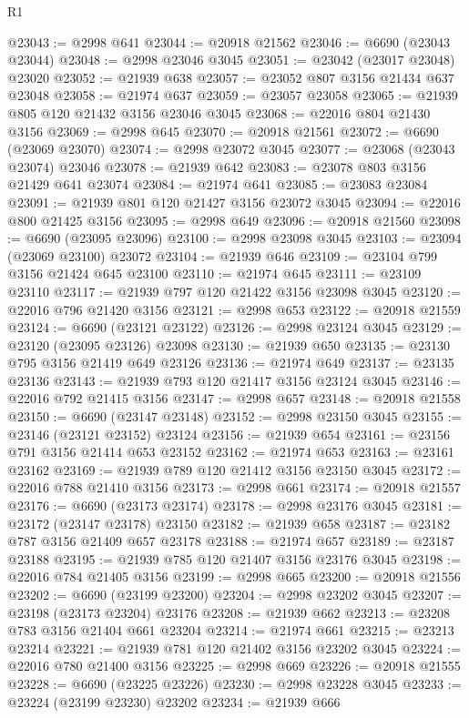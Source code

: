 \begin{lexlean}{R1}
\begin{coremodule}
@23043 := @2998 @641
@23044 := @20918 @21562
@23046 := @6690 (@23043 @23044)
@23048 := @2998 @23046 @3045
@23051 := @23042 (@23017 @23048) @23020
@23052 := @21939 @638
@23057 := @23052 @807 @3156 @21434 @637 @23048
@23058 := @21974 @637
@23059 := @23057 @23058
@23065 := @21939 @805 @120 @21432 @3156 @23046 @3045
@23068 := @22016 @804 @21430 @3156
@23069 := @2998 @645
@23070 := @20918 @21561
@23072 := @6690 (@23069 @23070)
@23074 := @2998 @23072 @3045
@23077 := @23068 (@23043 @23074) @23046
@23078 := @21939 @642
@23083 := @23078 @803 @3156 @21429 @641 @23074
@23084 := @21974 @641
@23085 := @23083 @23084
@23091 := @21939 @801 @120 @21427 @3156 @23072 @3045
@23094 := @22016 @800 @21425 @3156
@23095 := @2998 @649
@23096 := @20918 @21560
@23098 := @6690 (@23095 @23096)
@23100 := @2998 @23098 @3045
@23103 := @23094 (@23069 @23100) @23072
@23104 := @21939 @646
@23109 := @23104 @799 @3156 @21424 @645 @23100
@23110 := @21974 @645
@23111 := @23109 @23110
@23117 := @21939 @797 @120 @21422 @3156 @23098 @3045
@23120 := @22016 @796 @21420 @3156
@23121 := @2998 @653
@23122 := @20918 @21559
@23124 := @6690 (@23121 @23122)
@23126 := @2998 @23124 @3045
@23129 := @23120 (@23095 @23126) @23098
@23130 := @21939 @650
@23135 := @23130 @795 @3156 @21419 @649 @23126
@23136 := @21974 @649
@23137 := @23135 @23136
@23143 := @21939 @793 @120 @21417 @3156 @23124 @3045
@23146 := @22016 @792 @21415 @3156
@23147 := @2998 @657
@23148 := @20918 @21558
@23150 := @6690 (@23147 @23148)
@23152 := @2998 @23150 @3045
@23155 := @23146 (@23121 @23152) @23124
@23156 := @21939 @654
@23161 := @23156 @791 @3156 @21414 @653 @23152
@23162 := @21974 @653
@23163 := @23161 @23162
@23169 := @21939 @789 @120 @21412 @3156 @23150 @3045
@23172 := @22016 @788 @21410 @3156
@23173 := @2998 @661
@23174 := @20918 @21557
@23176 := @6690 (@23173 @23174)
@23178 := @2998 @23176 @3045
@23181 := @23172 (@23147 @23178) @23150
@23182 := @21939 @658
@23187 := @23182 @787 @3156 @21409 @657 @23178
@23188 := @21974 @657
@23189 := @23187 @23188
@23195 := @21939 @785 @120 @21407 @3156 @23176 @3045
@23198 := @22016 @784 @21405 @3156
@23199 := @2998 @665
@23200 := @20918 @21556
@23202 := @6690 (@23199 @23200)
@23204 := @2998 @23202 @3045
@23207 := @23198 (@23173 @23204) @23176
@23208 := @21939 @662
@23213 := @23208 @783 @3156 @21404 @661 @23204
@23214 := @21974 @661
@23215 := @23213 @23214
@23221 := @21939 @781 @120 @21402 @3156 @23202 @3045
@23224 := @22016 @780 @21400 @3156
@23225 := @2998 @669
@23226 := @20918 @21555
@23228 := @6690 (@23225 @23226)
@23230 := @2998 @23228 @3045
@23233 := @23224 (@23199 @23230) @23202
@23234 := @21939 @666

\end{coremodule}
\end{lexlean}
